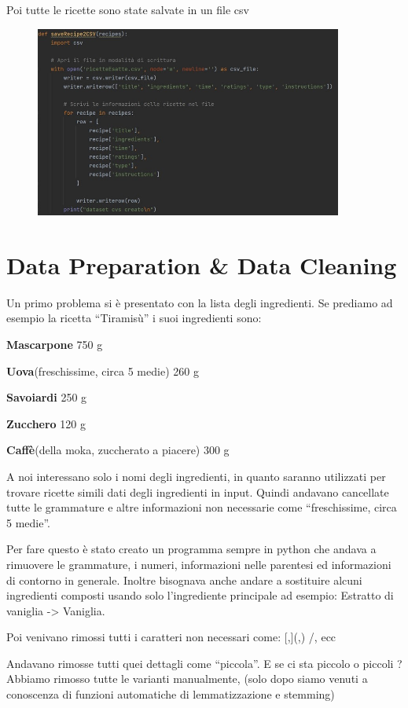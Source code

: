 \documentclass[12pt]{report}
\begin{document}
Poi tutte le ricette sono state salvate in un file csv
    \begin{figure}[H]
        \centering
        {\includegraphics[width=0.9\textwidth]{img/img3.jpg}}
    \end{figure}


\section{Data Preparation \& Data Cleaning}
Un primo problema si è presentato con la lista degli ingredienti. Se prediamo ad esempio la ricetta “Tiramisù” i suoi ingredienti sono: 

\textbf{Mascarpone} 750 g

\textbf{Uova}(freschissime, circa 5 medie) 260 g

\textbf{Savoiardi} 250 g

\textbf{Zucchero} 120 g

\textbf{Caffè}(della moka, zuccherato a piacere) 300 g

A noi interessano solo i nomi degli ingredienti, in quanto saranno utilizzati per trovare ricette simili dati degli ingredienti in input. Quindi andavano cancellate tutte le grammature e altre informazioni non necessarie come “freschissime, circa 5 medie”.

Per fare questo è stato creato un programma sempre in python che andava a rimuovere le grammature, i numeri, informazioni nelle parentesi ed informazioni di contorno in generale. Inoltre bisognava anche andare a sostituire alcuni ingredienti composti usando solo l’ingrediente principale ad esempio: Estratto di vaniglia -> Vaniglia. 

Poi venivano rimossi tutti i caratteri non necessari come: [,](,) /, ecc

Andavano rimosse tutti quei dettagli come “piccola”. E se ci sta piccolo o piccoli ? Abbiamo rimosso tutte le varianti manualmente, (solo dopo siamo venuti a conoscenza di funzioni automatiche di lemmatizzazione e stemming)
\end{document}
